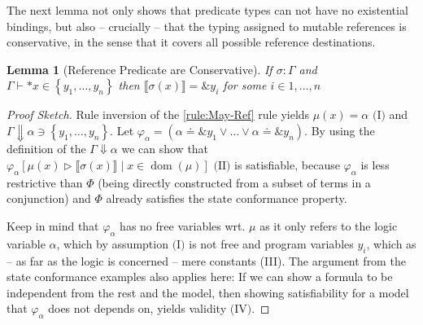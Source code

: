 \documentclass[twoside, english, final]{sdqthesis}
\newcommand{\set}[1]{\left\{ #1 \right\}}
\newcommand{\bbracket}[1]{\llbracket #1 \rrbracket}
\newcommand{\tr}[0]{\triangleright}
\DeclareMathOperator{\dom}{dom}
\newtheorem{lemma}[theorem]{Lemma}
\theoremstyle{definition}
\begin{document}
The next lemma not only shows that predicate types can not have no existential bindings, but also -- crucially -- that the typing assigned to mutable references is conservative, in the sense that it covers all possible reference destinations.
\begin{lemma}[Reference Predicate are Conservative]\label{lem:conservatice-reference-typing}
  If $\sigma : \Gamma $ and $\Gamma \vdash *x \in \set{y_1, \dots, y_n}$ then $\bbracket{\sigma(x)} = \&y_i$ for some $i \in 1, \dots, n$ 
\end{lemma}

\begin{proof}[Proof Sketch]
  Rule inversion of the \cref{rule:May-Ref} rule yields $\mu(x) = \alpha \text{ (I)}$ and $\Gamma\Downarrow \alpha \ni \set{y_1, \dots, y_n}$. 
  Let $\varphi_\alpha = (\alpha \doteq \&y_1 \vee \dots \vee \alpha \doteq \&y_n)$. By using the definition of the $\Gamma\Downarrow \alpha$ we can show that $\varphi_\alpha[\mu(x) \tr \bbracket{\sigma(x)} \mid x \in \dom(\mu)] \text{ (II)}$ is satisfiable, because $\varphi_\alpha$ is less restrictive than $\Phi$ (being directly constructed from a subset of terms in a conjunction) and $\Phi$ already satisfies the state conformance property. 

  Keep in mind that $\varphi_\alpha$ has no free variables wrt. $\mu$ as it only refers to the logic variable $\alpha$, which by assumption $\text{(I)}$ is not free and program variables $y_i$, which as -- as far as the logic is concerned -- mere constants (III). 
  The argument from the state conformance examples also applies here: If we can show a formula to be independent from the rest and the model, then showing satisfiability for a model that $\varphi_\alpha$ does not depends on, yields validity $\text{(IV)}$. 


\end{proof}
\end{document}
